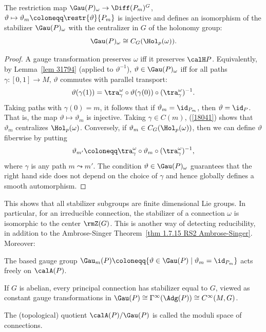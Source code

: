 \begin{prop}
    The restriction map $\Gau(P)_\omega\to \Diff(P_m)^G$, $\vartheta\mapsto \vartheta_m\coloneqq\restr{\vartheta}{P_m}$ is injective and defines an isomorphism of the stabilizer $\Gau(P)_\omega$ with the centralizer in $G$ of the holonomy group:
    \[\Gau(P)_\omega\cong C_G(\Hol_p(\omega)).\]
\end{prop}
\begin{proof}
    A gauge transformation preserves $\omega$ iff it preserves $\calH P$. Equivalently, by Lemma~\ref{lem 31794} (applied to $\vartheta^{-1}$), $\vartheta\in\Gau(P)_\omega$ iff for all paths $\gamma:[0,1]\to M$, $\vartheta$ commutes with parallel transport:
    \[\vartheta(\gamma(1))=\tra_\gamma^\omega\circ \vartheta(\gamma(0))\circ(\tra_\gamma^\omega)^{-1}.\label{18041}\]
    Taking paths with $\gamma(0)=m$, it follows that if $\vartheta_m=\id_{P_m}$, then $\vartheta=\id_P$. That is, the map $\vartheta\mapsto\vartheta_m$ is injective. Taking $\gamma\in C(m)$, (\ref{18041}) shows that $\vartheta_m$ centralizes $\Hol_p(\omega)$. Conversely, if $\vartheta_m\in C_G(\Hol_p(\omega))$, then we can define $\vartheta$ fiberwise by putting
    \[\vartheta_{m'}\coloneqq \tra_\gamma^\omega\circ \vartheta_m\circ (\tra_\gamma^\omega)^{-1},\]
    where $\gamma$ is any path $m\leadsto m'$. The condition $\vartheta\in \Gau(P)_\omega$ guarantees that the right hand side does not depend on the choice of $\gamma$ and hence globally defines a smooth automorphism.
\end{proof}

This shows that all stabilizer subgroups are finite dimensional Lie groups. In particular, for an irreducible connection, the stabilizer of a connection $\omega$ is isomorphic to the center $\rmZ(G)$. This is another way of detecting reducibility, in addition to the Ambrose-Singer Theorem~\ref{thm 1.7.15 RS2 Ambrose-Singer}. Moreover:

\begin{cor}
    The based gauge group $\Gau_m(P)\coloneqq \{\vartheta\in \Gau(P)\mid \vartheta_m=\id_{P_m}\}$ acts freely on $\calA(P)$.
\end{cor}
\begin{cor}
    If $G$ is abelian, every principal connection has stabilizer equal to $G$, viewed as constant gauge transformations in $\Gau(P)\cong \Gamma^\infty(\Adg(P))\cong C^\infty(M,G)$.
\end{cor}

\begin{defn}
    The (topological) quotient $\calA(P)\slash \Gau(P)$ is called the moduli space of connections. 
\end{defn}

